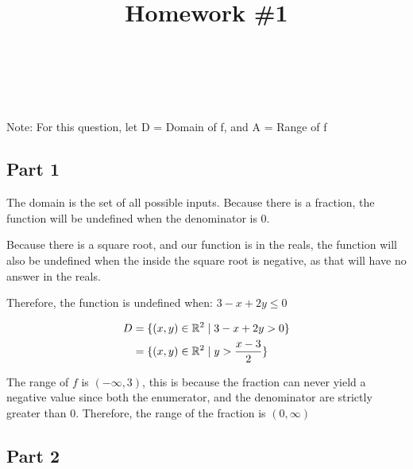 \documentclass[12pt]{article} %
\title{
    \vspace{2in}
        \textmd{\textbf{\classTitle}}\\
    \vspace{1in}
    \textmd{\textbf{Homework \#1}}\\
    \vspace{1in}
}
\author{
    \hmwkAuthorName\\
    \hmwkStudentnum\\
}
\date{}
\begin{document}
\maketitle

\pagebreak

\begin{homeworkProblem}

    Note: For this question, let D = Domain of f, and A = Range of f

    \subsection*{Part 1}

    The domain is the set of all possible inputs. Because there is a fraction, the function will be undefined when the
    denominator is 0.

    Because there is a square root, and our function is in the reals, the function will also be undefined when the inside the
    square root is negative, as that will have no answer in the reals.

    Therefore, the function is undefined when: $3 - x + 2y \leq 0$

    \begin{align*}
        D & = \{(x, y) \in \mathbb{R}^2 \mid 3 - x + 2y > 0\}      \\
          & = \{(x, y) \in \mathbb{R}^2 \mid y > \frac{x - 3}{2}\} \\
    \end{align*}

    The range of $f$ is $(-\infty, 3)$, this is because the fraction can never yield a negative value since both the enumerator, and the
    denominator are strictly greater than 0. Therefore, the range of the fraction is $(0, \infty)$

    \subsection*{Part 2}


\end{homeworkProblem}
\end{document}

